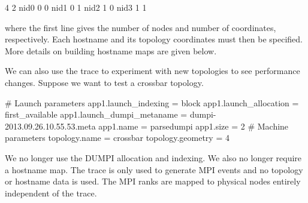\begin{ViFile}
4 2
nid0 0 0
nid1 0 1
nid2 1 0
nid3 1 1
\end{ViFile}
where the first line gives the number of nodes and number of coordinates, respectively.
Each hostname and its topology coordinates must then be specified.
More details on building hostname maps are given below.

We can also use the trace to experiment with new topologies to see performance changes.
Suppose we want to test a crossbar topology.

\begin{ViFile}
# Launch parameters
app1.launch_indexing = block
app1.launch_allocation = first_available
app1.launch_dumpi_metaname = dumpi-2013.09.26.10.55.53.meta
app1.name = parsedumpi
app1.size = 2
# Machine parameters
topology.name = crossbar
topology.geometry = 4
\end{ViFile}
We no longer use the DUMPI allocation and indexing. 
We also no longer require a hostname map.
The trace is only used to generate MPI events and no topology or hostname data is used.
The MPI ranks are mapped to physical nodes entirely independent of the trace.


